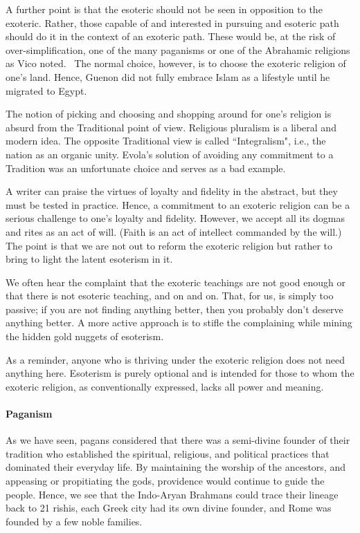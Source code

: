 A further point is that the esoteric should not be seen in opposition to the exoteric. Rather, those capable of and interested in pursuing and esoteric path should do it in the context of an exoteric path. These would be, at the risk of over-simplification, one of the many paganisms or one of the Abrahamic religions as Vico noted.  The normal choice, however, is to choose the exoteric religion of one's land. Hence, Guenon did not fully embrace Islam as a lifestyle until he migrated to Egypt.

The notion of picking and choosing and shopping around for one's religion is absurd from the Traditional point of view. Religious pluralism is a liberal and modern idea. The opposite Traditional view is called ``Integralism", i.e., the nation as an organic unity. Evola's solution of avoiding any commitment to a Tradition was an unfortunate choice and serves as a bad example.

A writer can praise the virtues of loyalty and fidelity in the abstract, but they must be tested in practice. Hence, a commitment to an exoteric religion can be a serious challenge to one's loyalty and fidelity. However, we accept all its dogmas and rites as an act of will. (Faith is an act of intellect commanded by the will.) The point is that we are not out to reform the exoteric religion but rather to bring to light the latent esoterism in it.

We often hear the complaint that the exoteric teachings are not good enough or that there is not esoteric teaching, and on and on. That, for us, is simply too passive; if you are not finding anything better, then you probably don't deserve anything better. A more active approach is to stifle the complaining while mining the hidden gold nuggets of esoterism.

As a reminder, anyone who is thriving under the exoteric religion does not need anything here. Esoterism is purely optional and is intended for those to whom the exoteric religion, as conventionally expressed, lacks all power and meaning.

\paragraph{Paganism}
As we have seen, pagans considered that there was a semi-divine founder of their tradition who established the spiritual, religious, and political practices that dominated their everyday life. By maintaining the worship of the ancestors, and appeasing or propitiating the gods, providence would continue to guide the people. Hence, we see that the Indo-Aryan Brahmans could trace their lineage back to 21 rishis, each Greek city had its own divine founder, and Rome was founded by a few noble families.

